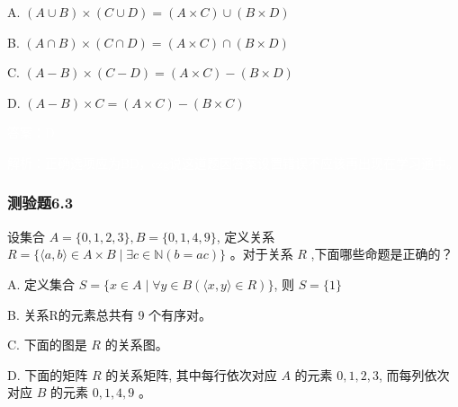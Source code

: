 \documentclass[UTF8, heading=true]{ctexart}
\begin{document}
A. 
$
(A \cup B) \times(C \cup D)=(A \times C) \cup(B \times D)
$

B. 
$
(A \cap B) \times(C \cap D)=(A \times C) \cap(B \times D)
$

C. 
$
(A-B) \times(C-D)=(A \times C)-(B \times D)
$

D. 
$
(A-B) \times C=(A \times C)-(B \times C)
$

\textcolor{white}{答案：D}

\textcolor{white}{解析：正确选项应为BD，czg说这道题因答案设置错误不应该再出现在学习通中。}

\subsubsection{测验题6.3}

设集合 $A=\{0,1,2,3\}, B=\{0,1,4,9\}$, 定义关系 $R=\{\langle a, b\rangle \in A \times B \mid \exists c \in \mathbb{N}(b=a c)\}$ 。对于关系 $R$ ,下面哪些命题是正确的？

A. 定义集合 $S=\{x \in A \mid \forall y \in B(\langle x, y\rangle \in R)\}$, 则 $S=\{1\}$

B. 关系R的元素总共有 9 个有序对。

C. 下面的图是 $R$ 的关系图。

D. 下面的矩阵 $R$ 的关系矩阵, 其中每行依次对应 $A$ 的元素 $0,1,2,3$, 而每列依次对应 $B$ 的元素 $0,1,4,9$ 。
\end{document}
